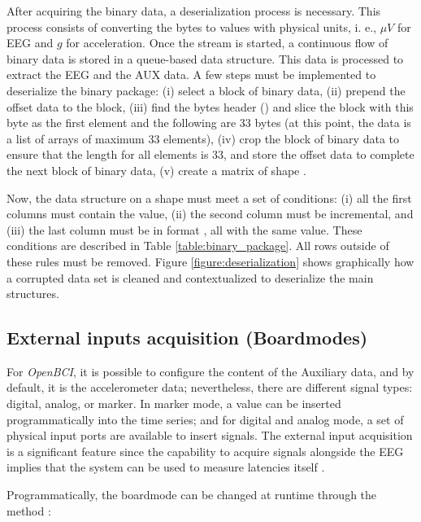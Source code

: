 After acquiring the binary data, a deserialization process is necessary. This process consists of converting the bytes to values with physical units, i. e., $\mu V$ for EEG and $g$ for acceleration. Once the stream is started, a continuous flow of binary data is stored in a queue-based data structure. This data is processed to extract the EEG and the AUX data. A few steps must be implemented to deserialize the binary package:
(i) select a block of binary data,
(ii) prepend the offset data to the block,
(iii) find the bytes header () and slice the block with this byte as the first element and the following are 33 bytes (at this point, the data is a list of arrays of maximum 33 elements),
(iv) crop the block of binary data to ensure that the length for all elements is 33, and store the offset data to complete the next block of binary data,
(v) create a matrix of shape .

Now, the data structure on a shape  must meet a set of conditions: (i) all the first columns must contain the  value, (ii) the second column must be incremental, and (iii) the last column must be in format , all with the same value. These conditions are described in Table \ref{table:binary_package}. All rows outside of these rules must be removed. Figure \ref{figure:deserialization} shows graphically how a corrupted data set is cleaned and contextualized to deserialize the main structures.

\subsection{External inputs acquisition (Boardmodes)}\label{subsec:boardmodes}

For \textit{OpenBCI}, it is possible to configure the content of the Auxiliary data, and by default, it is the accelerometer data; nevertheless, there are different signal types: digital, analog, or marker. In marker mode, a value can be inserted programmatically into the time series; and for digital and analog mode, a set of physical input ports are available to insert signals. The external input acquisition is a significant feature since the capability to acquire signals alongside the EEG implies that the system can be used to measure latencies itself \cite{wilson2010procedure}.

Programmatically, the boardmode can be changed at runtime through the method :


